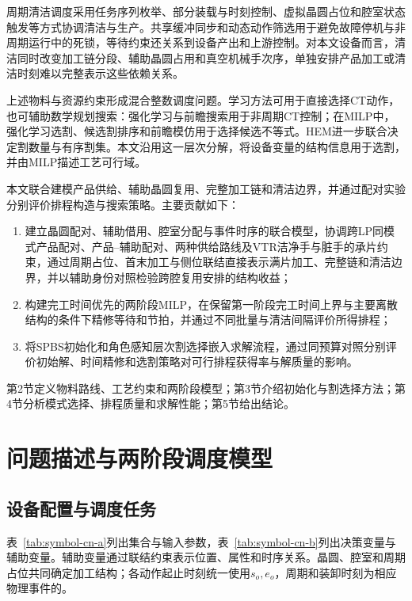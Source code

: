 \documentclass[final,5p,times,twocolumn]{elsarticle}
\begin{document}
周期清洁调度采用任务序列枚举、部分装载与时刻控制、虚拟晶圆占位和腔室状态触发等方式协调清洁与生产\citep{kim2013cleaning,yu2020delay,qiao2022binary,li2022conditioncleaning}。共享缓冲同步和动态动作筛选用于避免故障停机与非周期运行中的死锁\citep{zhu2025failuredeadlock,kim2025noncyclicdeadlock}，等待约束还关系到设备产出和上游控制\citep{lee2018waiting}。对本文设备而言，清洁同时改变加工链分段、辅助晶圆占用和真空机械手次序，单独安排产品加工或清洁时刻难以完整表示这些依赖关系。

上述物料与资源约束形成混合整数调度问题。学习方法可用于直接选择CT动作，也可辅助数学规划搜索：强化学习与前瞻搜索用于非周期CT控制\citep{kim2025adaptivecluster}；在MILP中，强化学习选割、候选割排序和前瞻模仿用于选择候选不等式\citep{tang2020cut,huang2022cutranking,paulus2022looking}。HEM进一步联合决定割数量与有序割集\citep{wang2023hem}。本文沿用这一层次分解，将设备变量的结构信息用于选割，并由MILP描述工艺可行域。

本文联合建模产品供给、辅助晶圆复用、完整加工链和清洁边界，并通过配对实验分别评价排程构造与搜索策略。主要贡献如下：
\begin{enumerate}[leftmargin=*]
\item 建立晶圆配对、辅助借用、腔室分配与事件时序的联合模型，协调跨LP同模式产品配对、产品--辅助配对、两种供给路线及VTR洁净手与脏手的承片约束，通过周期占位、首末加工与侧位联结直接表示满片加工、完整链和清洁边界，并以辅助身份对照检验跨腔复用安排的结构收益；
\item 构建完工时间优先的两阶段MILP，在保留第一阶段完工时间上界与主要离散结构的条件下精修等待和节拍，并通过不同批量与清洁间隔评价所得排程；
\item 将SPBS初始化和角色感知层次割选择嵌入求解流程，通过同预算对照分别评价初始解、时间精修和选割策略对可行排程获得率与解质量的影响。
\end{enumerate}

第2节定义物料路线、工艺约束和两阶段模型；第3节介绍初始化与割选择方法；第4节分析模式选择、排程质量和求解性能；第5节给出结论。

\section{问题描述与两阶段调度模型}
\setcounter{equation}{0}

\subsection{设备配置与调度任务}

表~\ref{tab:symbol-cn-a}列出集合与输入参数，表~\ref{tab:symbol-cn-b}列出决策变量与辅助变量。辅助变量通过联结约束表示位置、属性和时序关系。晶圆、腔室和周期占位共同确定加工结构；各动作起止时刻统一使用$s_o,e_o$，周期和装卸时刻为相应物理事件的。
\end{document}
